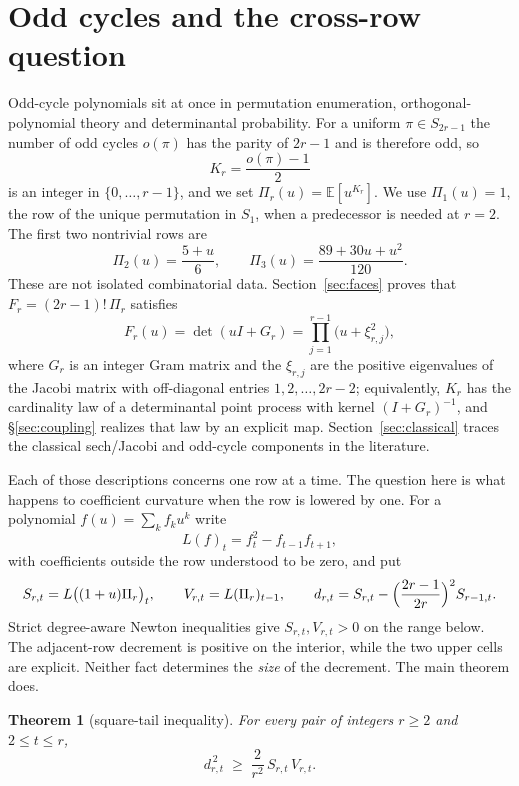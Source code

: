\documentclass[11pt,a4paper]{article}
\theoremstyle{plain}
\newtheorem{theorem}{Theorem}[section]
\theoremstyle{definition}
\theoremstyle{remark}
\newcommand{\E}{\mathbb{E}}
\begin{document}
\section{Odd cycles and the cross-row question}\label{sec:intro}

Odd-cycle polynomials sit at once in permutation enumeration,
orthogonal-polynomial theory and determinantal probability. For a uniform
$\pi\in S_{2r-1}$ the number of odd cycles $o(\pi)$ has the parity of $2r-1$ and
is therefore odd, so
\[
  K_r=\frac{o(\pi)-1}{2}
\]
is an integer in $\{0,\dots,r-1\}$, and we set $\Pi_r(u)=\E[u^{K_r}]$. We use
$\Pi_1(u)=1$, the row of the unique permutation in $S_1$, when a predecessor is
needed at $r=2$. The first two nontrivial rows are
\[
  \Pi_2(u)=\frac{5+u}{6},\qquad
  \Pi_3(u)=\frac{89+30u+u^2}{120}.
\]
These are not isolated combinatorial data. Section~\ref{sec:faces} proves that
$F_r=(2r-1)!\,\Pi_r$ satisfies
\[
  F_r(u)=\det(uI+G_r)=\prod_{j=1}^{r-1}\bigl(u+\xi_{r,j}^2\bigr),
\]
where $G_r$ is an integer Gram matrix and the $\xi_{r,j}$ are the positive
eigenvalues of the Jacobi matrix with off-diagonal entries $1,2,\dots,2r-2$;
equivalently, $K_r$ has the cardinality law of a determinantal point process
with kernel $(I+G_r)^{-1}$, and \S\ref{sec:coupling} realizes that law by an
explicit map. Section~\ref{sec:classical} traces the classical sech/Jacobi and
odd-cycle components in the literature.

Each of those descriptions concerns one row at a time. The question here is what
happens to coefficient curvature when the row is lowered by one. For a
polynomial $f(u)=\sum_kf_ku^k$ write
\begin{equation}\label{eq:Lop}
  L(f)_t=f_t^2-f_{t-1}f_{t+1},
\end{equation}
with coefficients outside the row understood to be zero, and put
\begin{equation}\label{eq:SVd}
  S_{r,t}=L\bigl((1+u)\Pi_r\bigr)_t,\qquad
  V_{r,t}=L(\Pi_r)_{t-1},\qquad
  d_{r,t}=S_{r,t}-\Bigl(\frac{2r-1}{2r}\Bigr)^{2}S_{r-1,t}.
\end{equation}
Strict degree-aware Newton inequalities give $S_{r,t},V_{r,t}>0$ on the range
below. The adjacent-row decrement is positive on the interior, while the two
upper cells are explicit. Neither fact determines the \emph{size} of the
decrement. The main theorem does.

\begin{theorem}[square-tail inequality]\label{thm:sq}
For every pair of integers $r\ge2$ and $2\le t\le r$,
\[
  d_{r,t}^{\,2}\;\ge\;\frac{2}{r^2}\,S_{r,t}\,V_{r,t}.
\]
\end{theorem}
\end{document}
